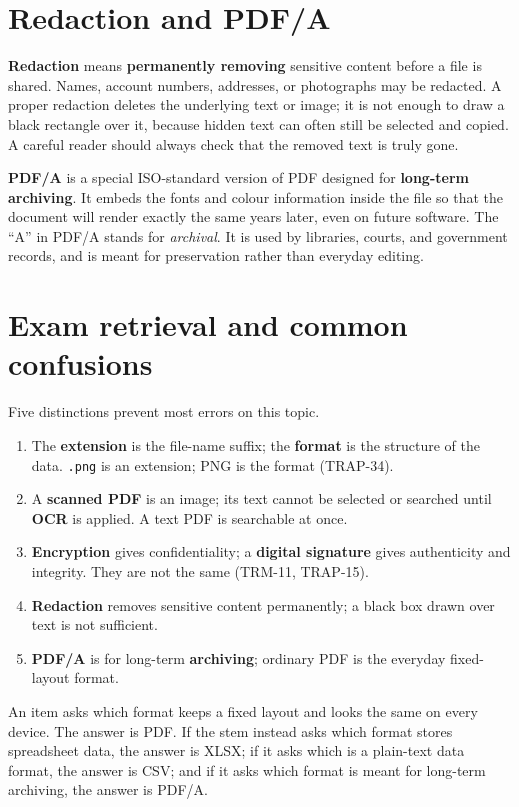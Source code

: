 \section{Redaction and PDF/A}
\textbf{Redaction} means \textbf{permanently removing} sensitive content
before a file is shared. Names, account numbers, addresses, or photographs
may be redacted. A proper redaction deletes the underlying text or image; it
is not enough to draw a black rectangle over it, because hidden text can
often still be selected and copied. A careful reader should always check that
the removed text is truly gone.

\textbf{PDF/A} is a special ISO-standard version of PDF designed for
\textbf{long-term archiving}. It embeds the fonts and colour information
inside the file so that the document will render exactly the same years later,
even on future software. The ``A'' in PDF/A stands for \emph{archival}. It is
used by libraries, courts, and government records, and is meant for
preservation rather than everyday editing.

\section{Exam retrieval and common confusions}
Five distinctions prevent most errors on this topic.
\begin{enumerate}
  \item The \textbf{extension} is the file-name suffix; the \textbf{format}
    is the structure of the data. \texttt{.png} is an extension; PNG is the
    format (TRAP-34).
  \item A \textbf{scanned PDF} is an image; its text cannot be selected or
    searched until \textbf{OCR} is applied. A text PDF is searchable at once.
  \item \textbf{Encryption} gives confidentiality; a \textbf{digital
    signature} gives authenticity and integrity. They are not the same
    (TRM-11, TRAP-15).
  \item \textbf{Redaction} removes sensitive content permanently; a black
    box drawn over text is not sufficient.
  \item \textbf{PDF/A} is for long-term \textbf{archiving}; ordinary PDF is
    the everyday fixed-layout format.
\end{enumerate}

\begin{example}
An item asks which format keeps a fixed layout and looks the same on every
device. The answer is PDF. If the stem instead asks which format stores
spreadsheet data, the answer is XLSX; if it asks which is a plain-text data
format, the answer is CSV; and if it asks which format is meant for long-term
archiving, the answer is PDF/A.
\end{example}

